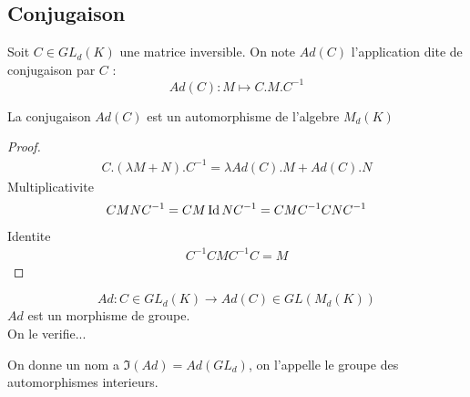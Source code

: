 \documentclass[../main.tex]{subfiles}
\begin{document}
\subsection{Conjugaison}
\begin{defn}
	Soit $C\in GL_d( K) $ une matrice inversible. On note $Ad( C)$ l'application dite de conjugaison par $C$ :
	\[ 
		Ad( C) : M \mapsto C.M.C^{-1}
	\]
	
\end{defn}
\begin{propo}
	La conjugaison $Ad( C)$ est un automorphisme de l'algebre $M_d( K) $ 
\end{propo}
\begin{proof}
	\begin{align*}
		C.( \lambda M + N).C^{-1}= \lambda Ad( C) .M + Ad(  C).N
	\end{align*}
	Multiplicativite
	\begin{align*}
	CMNC^{-1}= CM\operatorname*{Id} NC^{-1}= CMC^{-1}CNC^{-1}
	\end{align*}
	Identite
	\begin{align*}
	C^{-1}CMC^{-1}C = M
	\end{align*}
	
	
	
\end{proof}
\begin{defn}
	\[ 
		Ad: C \in GL_d( K) \to Ad( C)  \in GL( M_d( K) ) 
	\]
	$Ad$ est un morphisme de groupe.\\
	On le verifie...


\end{defn}
On donne un nom a $\Im( Ad) = Ad( GL_d) $, on l'appelle le groupe des automorphismes interieurs.
\end{document}
